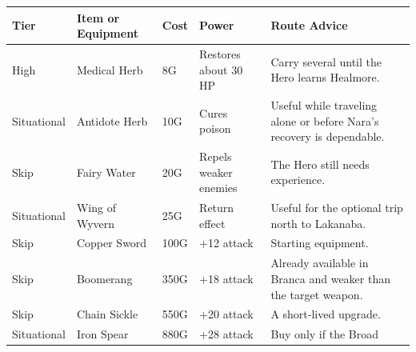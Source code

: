 \documentclass[
  american,
  10pt,
  letterpaper,
  oneside,
  open=any]{scrreprt}
\newcounter{none} %
\newenvironment{guidetable}{%
  \small\setstretch{1.0}%
  \setlength{\tabcolsep}{4pt}%
  \setlength{\LTpre}{8pt}\setlength{\LTpost}{10pt}%
  \renewcommand{\arraystretch}{1.16}%
}{ }
\begin{document}
\begin{guidetable}

{\def\LTcaptype{none} %
\begin{longtable}[]{@{}
  >{\raggedright\arraybackslash}p{}
  >{\raggedright\arraybackslash}p{}
  >{\raggedleft\arraybackslash}p{}
  >{\raggedleft\arraybackslash}p{}
  >{\raggedright\arraybackslash}p{}@{}}
\toprule\noalign{}
\begin{minipage}[b]{\linewidth}\raggedright
\color{GuideGreen}\bfseries Tier
\end{minipage} & \begin{minipage}[b]{\linewidth}\raggedright
\color{GuideGreen}\bfseries Item or Equipment
\end{minipage} & \begin{minipage}[b]{\linewidth}\raggedleft
\color{GuideGreen}\bfseries Cost
\end{minipage} & \begin{minipage}[b]{\linewidth}\raggedleft
\color{GuideGreen}\bfseries Power
\end{minipage} & \begin{minipage}[b]{\linewidth}\raggedright
\color{GuideGreen}\bfseries Route Advice
\end{minipage} \\
\midrule\noalign{}
\endhead
\bottomrule\noalign{}
\endlastfoot
High & Medical Herb & 8G & Restores about 30 HP & Carry several until
the Hero learns Healmore. \\
Situational & Antidote Herb & 10G & Cures poison & Useful while
traveling alone or before Nara's recovery is dependable. \\
Skip & Fairy Water & 20G & Repels weaker enemies & The Hero still needs
experience. \\
Situational & Wing of Wyvern & 25G & Return effect & Useful for the
optional trip north to Lakanaba. \\
Skip & Copper Sword & 100G & +12 attack & Starting equipment. \\
Skip & Boomerang & 350G & +18 attack & Already available in Branca and
weaker than the target weapon. \\
Skip & Chain Sickle & 550G & +20 attack & A short-lived upgrade. \\
Situational & Iron Spear & 880G & +28 attack & Buy only if the Broad

\end{longtable}}
\end{guidetable}
\end{document}
